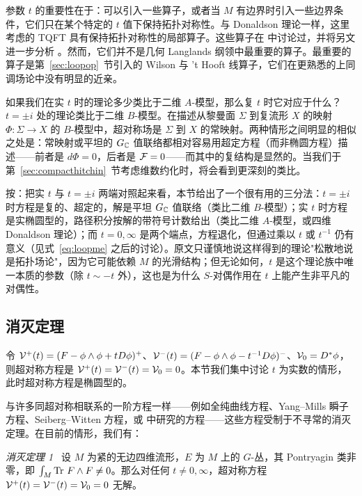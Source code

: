 参数 $t$ 的重要性在于：可以引入一些算子，或者当 $M$ 有边界时引入一些边界条件，它们只在某个特定的 $t$ 值下保持拓扑对称性。与 Donaldson 理论一样，这里考虑的 TQFT 具有保持拓扑对称性的局部算子。这些算子在 \cite{ref53,ref54,ref55,ref56,ref57} 中讨论过，并将另文进一步分析 \cite{ref26}。然而，它们并不是几何 Langlands 纲领中最重要的算子。最重要的算子是第~\ref{sec:loopop}~节引入的 Wilson 与 't Hooft 线算子，它们在更熟悉的上同调场论中没有明显的近亲。

如果我们在实 $t$ 时的理论多少类比于二维 $A$-模型，那么复 $t$ 时它对应于什么？$t=\pm i$ 处的理论类比于二维 $B$-模型。在描述从黎曼面 $\Sigma$ 到复流形 $X$ 的映射 $\Phi:\Sigma\to X$ 的 $B$-模型中，超对称场是 $\Sigma$ 到 $X$ 的常映射。两种情形之间明显的相似之处是：常映射或平坦的 $G_{\Bbb{C}}$ 值联络都相对容易用超定方程（而非椭圆方程）描述——前者是 $d\Phi=0$，后者是 ${\cal F}=0$——而其中的复结构是显然的。当我们于第~\ref{sec:compacthitchin}~节考虑维数约化时，将会看到更深刻的类比。

\begin{yizhu}[物理图像]
按：把实 $t$ 与 $t=\pm i$ 两端对照起来看，本节给出了一个很有用的三分法：$t=\pm i$ 时方程是复的、超定的，解是平坦 $G_{\Bbb{C}}$ 值联络（类比二维 $B$-模型）；实 $t$ 时方程是实椭圆型的，路径积分按解的带符号计数给出（类比二维 $A$-模型，或四维 Donaldson 理论）；而 $t=0,\infty$ 是两个端点，方程退化，但通过乘以 $t$ 或 $t^{-1}$ 仍有意义（见式~\eqref{eq:loopme} 之后的讨论）。原文只谨慎地说这样得到的理论"松散地说是拓扑场论"，因为它可能依赖 $M$ 的光滑结构；但无论如何，$t$ 是这个理论族中唯一本质的参数（除 $t\sim-t$ 外），这也是为什么 $S$-对偶作用在 $t$ 上能产生非平凡的对偶性。
\end{yizhu}

\subsection{消灭定理}

\label{sec:vanishing}

令 $\EUV^+(t)= (F-\phi\wedge\phi+tD\phi)^+$、$\EUV^-(t)= (F-\phi\wedge\phi-t^{-1}D\phi)^-$、$\EUV_0= D^* \phi$，则超对称方程是 $\EUV^+(t)=\EUV^-(t)=\EUV_0=0$。本节我们集中讨论 $t$ 为实数的情形，此时超对称方程是椭圆型的。

与许多同超对称相联系的一阶方程一样——例如全纯曲线方程、Yang--Mills 瞬子方程、Seiberg--Witten 方程，或 \cite{ref45} 中研究的方程——这些方程受制于不寻常的消灭定理。在目前的情形，我们有：

\par\medskip
 {\it 消灭定理 1~}  设 $M$ 为紧的无边四维流形，$E$ 为 $M$ 上的 $G$-丛，其 Pontryagin 类非零，即 $\int_M\Tr\,F\wedge F\not=0$。那么对任何 $t\not=0,\infty$，超对称方程 $\EUV^+(t)=\EUV^-(t)=\EUV_0=0$ 无解。

